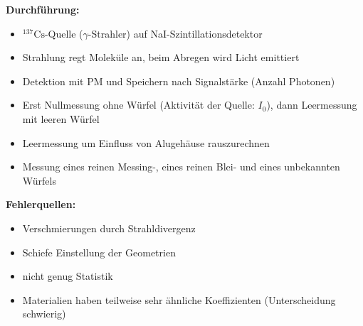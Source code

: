 \textbf{Durchführung:}
\begin{itemize}
    \item $^{137}\text{Cs}$-Quelle ($\gamma$-Strahler) auf NaI-Szintillationsdetektor
    \item Strahlung regt Moleküle an, beim Abregen wird Licht emittiert
    \item Detektion mit PM und Speichern nach Signalstärke (Anzahl Photonen)
    \item Erst Nullmessung ohne Würfel (Aktivität der Quelle: $I_0$), dann Leermessung mit leeren Würfel
    \item Leermessung um Einfluss von Alugehäuse rauszurechnen
    \item Messung eines reinen Messing-, eines reinen Blei- und eines unbekannten Würfels
\end{itemize}

\textbf{Fehlerquellen:}
\begin{itemize}
    \item Verschmierungen durch Strahldivergenz
    \item Schiefe Einstellung der Geometrien
    \item nicht genug Statistik
    \item Materialien haben teilweise sehr ähnliche Koeffizienten (Unterscheidung schwierig)
\end{itemize}
